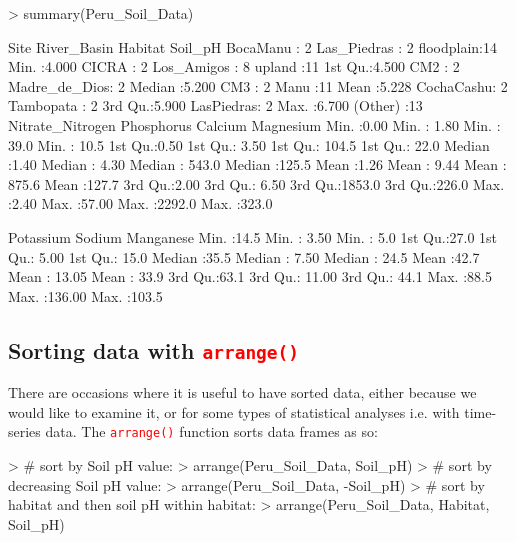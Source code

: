 \documentclass[a4paper,12pt]{article}
\newcommand\code[1]{\textcolor{red}{\texttt{#1}}}
\begin{document}
\begin{shaded}
\begin{Schunk}
\begin{Sinput}
> summary(Peru_Soil_Data)
\end{Sinput}
\begin{Soutput}
         Site           River_Basin       Habitat      Soil_pH     
 BocaManu  : 2   Las_Piedras  : 2   floodplain:14   Min.   :4.000  
 CICRA     : 2   Los_Amigos   : 8   upland    :11   1st Qu.:4.500  
 CM2       : 2   Madre_de_Dios: 2                   Median :5.200  
 CM3       : 2   Manu         :11                   Mean   :5.228  
 CochaCashu: 2   Tambopata    : 2                   3rd Qu.:5.900  
 LasPiedras: 2                                      Max.   :6.700  
 (Other)   :13                                                     
 Nitrate_Nitrogen   Phosphorus       Calcium         Magnesium    
 Min.   :0.00     Min.   : 1.80   Min.   :  39.0   Min.   : 10.5  
 1st Qu.:0.50     1st Qu.: 3.50   1st Qu.: 104.5   1st Qu.: 22.0  
 Median :1.40     Median : 4.30   Median : 543.0   Median :125.5  
 Mean   :1.26     Mean   : 9.44   Mean   : 875.6   Mean   :127.7  
 3rd Qu.:2.00     3rd Qu.: 6.50   3rd Qu.:1853.0   3rd Qu.:226.0  
 Max.   :2.40     Max.   :57.00   Max.   :2292.0   Max.   :323.0  
                                                                  
   Potassium        Sodium         Manganese    
 Min.   :14.5   Min.   :  3.50   Min.   :  5.0  
 1st Qu.:27.0   1st Qu.:  5.00   1st Qu.: 15.0  
 Median :35.5   Median :  7.50   Median : 24.5  
 Mean   :42.7   Mean   : 13.05   Mean   : 33.9  
 3rd Qu.:63.1   3rd Qu.: 11.00   3rd Qu.: 44.1  
 Max.   :88.5   Max.   :136.00   Max.   :103.5  
\end{Soutput}
\end{Schunk}
\end{shaded}

\subsection{Sorting data with \code{arrange()}}

There are occasions where it is useful to have sorted data, either because we would like to examine it, or for some types of statistical analyses i.e. with time-series data. The \code{arrange()} function sorts data frames as so:

\begin{shaded}
\begin{Schunk}
\begin{Sinput}
>    # sort by Soil pH value:
> arrange(Peru_Soil_Data, Soil_pH) 
>    # sort by decreasing Soil pH value:
> arrange(Peru_Soil_Data, -Soil_pH) 
>    # sort by habitat and then soil pH within habitat:
> arrange(Peru_Soil_Data, Habitat, Soil_pH) 
\end{Sinput}
\end{Schunk}
\end{shaded}
\end{document}
